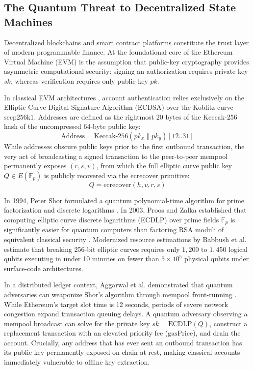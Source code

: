 \documentclass[a4paper,fleqn]{cas-dc}
\begin{document}
\subsection{The Quantum Threat to Decentralized State Machines}
Decentralized blockchains and smart contract platforms constitute the trust layer of modern programmable finance. At the foundational core of the Ethereum Virtual Machine (EVM) is the assumption that public-key cryptography provides asymmetric computational security: signing an authorization requires private key $sk$, whereas verification requires only public key $pk$. 

In classical EVM architectures \citep{wood2014ethereum}, account authentication relies exclusively on the Elliptic Curve Digital Signature Algorithm (ECDSA) over the Koblitz curve $\text{secp256k1}$. Addresses are defined as the rightmost 20 bytes of the Keccak-256 hash of the uncompressed 64-byte public key:
\begin{equation}
    \text{Address} = \text{Keccak-256}(pk_{x} \parallel pk_{y})[12..31]
    \label{eq:eth_address}
\end{equation}
While addresses obscure public keys prior to the first outbound transaction, the very act of broadcasting a signed transaction to the peer-to-peer mempool permanently exposes $(r, s, v)$, from which the full elliptic curve public key $Q \in E(\mathbb{F}_p)$ is publicly recovered via the $\text{ecrecover}$ primitive:
\begin{equation}
    Q = \text{ecrecover}(h, v, r, s)
    \label{eq:ecrecover}
\end{equation}

In 1994, Peter Shor formulated a quantum polynomial-time algorithm for prime factorization and discrete logarithms \citep{shor1994algorithms}. In 2003, Proos and Zalka established that computing elliptic curve discrete logarithms (ECDLP) over prime fields $\mathbb{F}_p$ is significantly easier for quantum computers than factoring RSA moduli of equivalent classical security \citep{proos2003shor}. Modernized resource estimations by Babbush et al. \citep{babbush2026securing} estimate that breaking 256-bit elliptic curves requires only $1,200\text{ to }1,450$ logical qubits executing in under 10 minutes on fewer than $5 \times 10^5$ physical qubits under surface-code architectures. 

In a distributed ledger context, Aggarwal et al. demonstrated that quantum adversaries can weaponize Shor's algorithm through mempool front-running \citep{aggarwal2018quantum}. While Ethereum's target slot time is 12 seconds, periods of severe network congestion expand transaction queuing delays. A quantum adversary observing a mempool broadcast can solve for the private key $sk = \text{ECDLP}(Q)$, construct a replacement transaction with an elevated priority fee ($\text{gasPrice}$), and drain the account. Crucially, any address that has ever sent an outbound transaction has its public key permanently exposed on-chain at rest, making classical accounts immediately vulnerable to offline key extraction.
\end{document}
